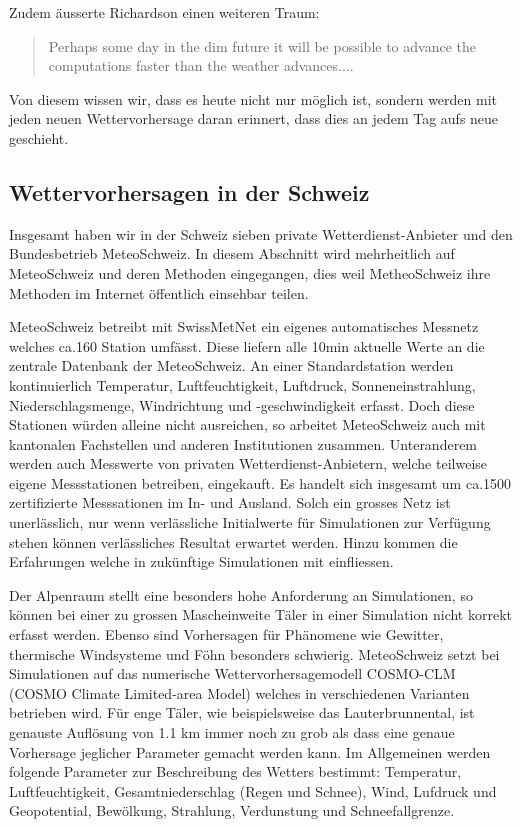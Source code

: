\begin{refsection}
Zudem äusserte Richardson einen weiteren Traum:
\begin{quote}
Perhaps some day in the dim future it will be possible to advance the computations faster than the weather advances....
\end{quote}
Von diesem wissen wir, dass es heute nicht nur möglich ist, sondern werden mit jeden neuen Wettervorhersage daran erinnert, dass dies an jedem Tag aufs neue geschieht.



\subsection{Wettervorhersagen in der Schweiz
\label{klima:section:wettervorhersagen}}

Insgesamt haben wir in der Schweiz sieben private Wetterdienst-Anbieter und den Bundesbetrieb MeteoSchweiz. In diesem Abschnitt wird mehrheitlich auf MeteoSchweiz und deren Methoden eingegangen, dies weil MetheoSchweiz ihre Methoden im Internet öffentlich einsehbar teilen.

MeteoSchweiz betreibt mit SwissMetNet ein eigenes automatisches Messnetz welches ca.160 Station umfässt. Diese liefern alle 10min aktuelle Werte an die zentrale Datenbank der MeteoSchweiz. An einer Standardstation werden kontinuierlich Temperatur, Luftfeuchtigkeit, Luftdruck, Sonneneinstrahlung, Niederschlagsmenge, Windrichtung und -geschwindigkeit erfasst. Doch diese Stationen würden alleine nicht ausreichen, so arbeitet MeteoSchweiz auch mit kantonalen Fachstellen und anderen Institutionen zusammen. Unteranderem werden auch Messwerte von privaten Wetterdienst-Anbietern, welche teilweise eigene Messstationen betreiben, eingekauft. Es handelt sich insgesamt um ca.1500 zertifizierte Messsationen im In- und Ausland. Solch ein grosses Netz ist unerlässlich, nur wenn verlässliche Initialwerte für Simulationen zur Verfügung stehen können verlässliches Resultat erwartet werden. Hinzu kommen die Erfahrungen welche in zukünftige Simulationen mit einfliessen. \cite{klima:meteoschweiz} 

Der Alpenraum stellt eine besonders hohe Anforderung an Simulationen, so können bei einer zu grossen Mascheinweite Täler in einer Simulation nicht korrekt erfasst werden. Ebenso sind Vorhersagen  für Phänomene wie Gewitter, thermische Windsysteme und Föhn besonders schwierig. MeteoSchweiz setzt bei Simulationen auf das numerische Wettervorhersagemodell COSMO-CLM (COSMO Climate Limited-area Model) welches in verschiedenen Varianten betrieben wird. Für enge Täler, wie beispielsweise das Lauterbrunnental, ist genauste Auflösung von 1.1 km immer noch zu grob als dass eine genaue Vorhersage jeglicher Parameter gemacht werden kann.
Im Allgemeinen werden folgende Parameter zur Beschreibung des Wetters bestimmt: Temperatur, Luftfeuchtigkeit, Gesamtniederschlag (Regen und Schnee), Wind, Lufdruck und Geopotential, Bewölkung, Strahlung, Verdunstung und Schneefallgrenze.


\end{refsection}
